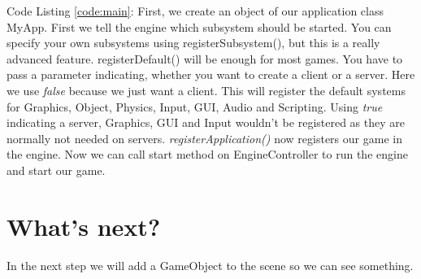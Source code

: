\documentclass{article}
\begin{document}
Code Listing \ref{code:main}: First, we create an object of our application class MyApp. First we tell the engine which subsystem should be started. You can specify your own subsystems using registerSubsystem(), but this is a really advanced feature. registerDefault() will be enough for most games. You have to pass a parameter indicating, whether you want to create a client or a server. Here we use \textit{false} because we just want a client. This will register the default systems for Graphics, Object, Physics, Input, GUI, Audio and Scripting. Using \textit{true} indicating a server, Graphics, GUI and Input wouldn't be registered as they are normally not needed on servers. \textit{registerApplication()} now registers our game in the engine. Now we can call start method on EngineController to run the engine and start our game.

\section{What's next?}

In the next step we will add a GameObject to the scene so we can see something.
\end{document}
